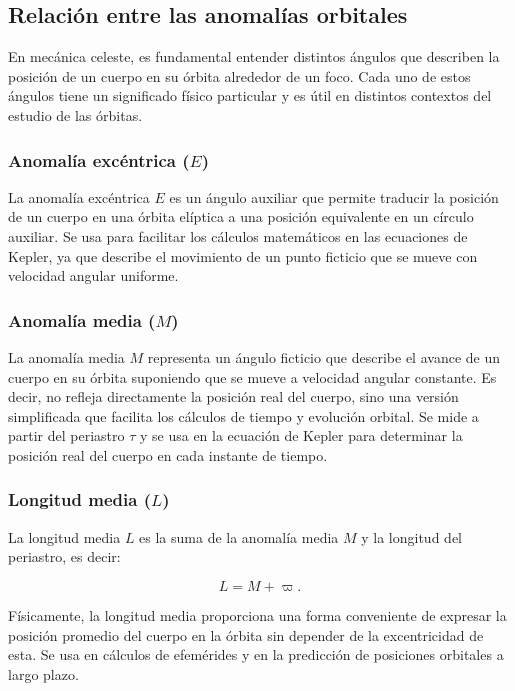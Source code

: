 \subsection{Relaci\'on entre las anomal\'ias orbitales}

En mec\'anica celeste, es fundamental entender distintos \'angulos que describen la posici\'on de un cuerpo en su \'orbita alrededor de un foco. Cada uno de estos \'angulos tiene un significado f\'isico particular y es \'util en distintos contextos del estudio de las \'orbitas. 

\subsubsection{Anomal\'ia exc\'entrica ($E$)}
La anomal\'ia exc\'entrica $E$ es un \'angulo auxiliar que permite traducir la posici\'on de un cuerpo en una \'orbita el\'iptica a una posici\'on equivalente en un c\'irculo auxiliar. Se usa para facilitar los c\'alculos matem\'aticos en las ecuaciones de Kepler, ya que describe el movimiento de un punto ficticio que se mueve con velocidad angular uniforme.

\subsubsection{Anomal\'ia media ($M$)}
La anomal\'ia media $M$ representa un \'angulo ficticio que describe el avance de un cuerpo en su \'orbita suponiendo que se mueve a velocidad angular constante. Es decir, no refleja directamente la posici\'on real del cuerpo, sino una versi\'on simplificada que facilita los c\'alculos de tiempo y evoluci\'on orbital. Se mide a partir del periastro $\tau$ y se usa en la ecuaci\'on de Kepler para determinar la posici\'on real del cuerpo en cada instante de tiempo.

\subsubsection{Longitud media ($L$)}
La longitud media $L$ es la suma de la anomal\'ia media $M$ y la longitud del periastro, es decir:

\begin{equation}
    L = M + \varpi.
\end{equation}

F\'isicamente, la longitud media proporciona una forma conveniente de expresar la posici\'on promedio del cuerpo en la \'orbita sin depender de la excentricidad de esta. Se usa en c\'alculos de efem\'erides y en la predicci\'on de posiciones orbitales a largo plazo.

